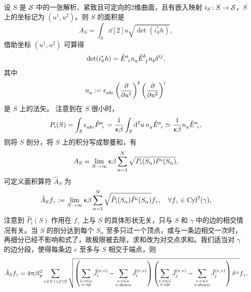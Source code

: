 		设 $S$ 是 $\mathcal{S}$ 中的一张解析、紧致且可定向的2维曲面，且有嵌入映射 $i_S \colon S \rightarrow \mathcal{S}$，$S$ 上的坐标记为 $(u^1,u^2)$。则 $S$ 的面积是
		\begin{equation}
			A_S = \int_S \dd[2]{u} \sqrt{\det(i^*_S h)},
		\end{equation}
		借助坐标 $(u^1,u^2)$ 可算得
		\begin{equation}
			\det(i^*_S h) = \tensor{\tilde{E}}{^a_i} \tensor{n}{_a} \tensor{\tilde{E}}{^b_j} \tensor{n}{_b} \tensor{\delta}{^i^j},
		\end{equation}
		其中
		\begin{equation}
			\tensor{n}{_a} \definedby \tensor{\nvol}{_a_b_c} \tensor{\left( \pdv{u^1} \right)}{^b} \tensor{\left( \pdv{u^2} \right)}{^c}
		\end{equation}
		是 $S$ 上的法矢。
		注意到在 $S$ 很小时，
		\begin{equation}
			P_i(S) = \int_S \tensor{\nvol}{_a_b_c} \tensor{\tilde{P}}{^a_i} = \frac{1}{\gkappa \beta} \int_S \dd[2]{u} \tensor{n}{_a} \tensor{\tilde{E}}{^a_i} \simeq \frac{1}{\gkappa \beta} \tensor{n}{_a} \tensor{\tilde{E}}{^a_i},
		\end{equation}
		则将 $S$ 剖分，将 $S$ 上的积分写成黎曼和，有
		\begin{equation}
			A_S = \lim_{N\rightarrow \infty} \upkappa \beta \sum_{\alpha=1}^N \sqrt{P_i(S_\alpha) P^i(S_\alpha)},
		\end{equation}
		可定义面积算符 $\hat{A}_S$ 为
		\begin{equation}
			\hat{A}_S f_\gamma \definedby \lim_{N\rightarrow \infty} \gkappa \beta \sum_{\alpha=1}^N \sqrt{\hat{P}_i(S_\alpha) \hat{P}^i(S_\alpha)} f_\gamma \qc \forall f_\gamma \in \Cyl^2(\gamma),
		\end{equation}
		注意到 $\hat{P}_i(S)$ 作用在 $f_\gamma$ 上与 $S$ 的具体形状无关，只与 $S$ 和 $\gamma$ 中的边的相交情况有关。当 $S$ 的剖分达到每个 $S_\alpha$ 至多只过一个顶点，或与一条边相交一次时，再细分已经不影响和式了，故极限被去除，求和改为对交点求和。我们适当对 $\gamma$ 的边分段，使得每条边 $e$ 至多与 $S$ 相交于端点，则
		\begin{equation}
			\hat{A}_S f_\gamma = 4\uppi \beta l_p^2  \sum_{v\in V(\gamma)\cap S} \sqrt{\left( \sum_{\substack{e:v\in e\\e:up}} \hat{J}^{(e,v)}_i - \sum_{\substack{e:v\in e\\e:down}} \hat{J}^{(e,v)}_i \right) \left( \sum_{\substack{e:v\in e\\e:up}} \hat{J}^{(e,v)}_j - \sum_{\substack{e:v\in e\\e:down}} \hat{J}^{(e,v)}_j \right) \tensor{\delta}{^i^j}} f_\gamma,
		\end{equation}
